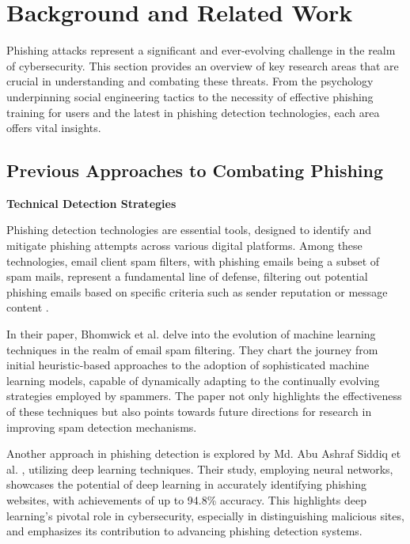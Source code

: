 \documentclass[
  a4paper,  %
  twoside,  %
  bibliography=totoc,
  headsepline,
  cleardoublepage=empty,
  parskip=half,
  draft=false
]{scrbook}
\begin{document}

\chapter{Background and Related Work}
\label{sec:relatedwork}

Phishing attacks represent a significant and ever-evolving challenge in the realm of cybersecurity. This section provides an overview of key research areas that are crucial in understanding and combating these threats.  From the psychology underpinning social engineering tactics to the necessity of effective phishing training for users and the latest in phishing detection technologies, each area offers vital insights.

\section{Previous Approaches to Combating Phishing}
\textbf{Technical Detection Strategies}

Phishing detection technologies are essential tools, designed to identify and mitigate phishing attempts across various digital platforms. Among these technologies, email client spam filters, with phishing emails being a subset of spam mails, represent a fundamental line of defense, filtering out potential phishing emails based on specific criteria such as sender reputation \cite{shi} or message content \cite{alexy}.

In their paper, Bhomwick et al. \cite{alexy} delve into the evolution of machine learning techniques in the realm of email spam filtering. They chart the journey from initial heuristic-based approaches to the adoption of sophisticated machine learning models, capable of dynamically adapting to the continually evolving strategies employed by spammers. The paper not only highlights the effectiveness of these techniques but also points towards future directions for research in improving spam detection mechanisms.

Another approach in phishing detection is explored by Md. Abu Ashraf Siddiq et al. \cite{siddiq}, utilizing deep learning techniques. Their study, employing neural networks, showcases the potential of deep learning in accurately identifying phishing websites, with achievements of up to 94.8\% accuracy. This highlights deep learning's pivotal role in cybersecurity, especially in distinguishing malicious sites, and emphasizes its contribution to advancing phishing detection systems.
\end{document}
